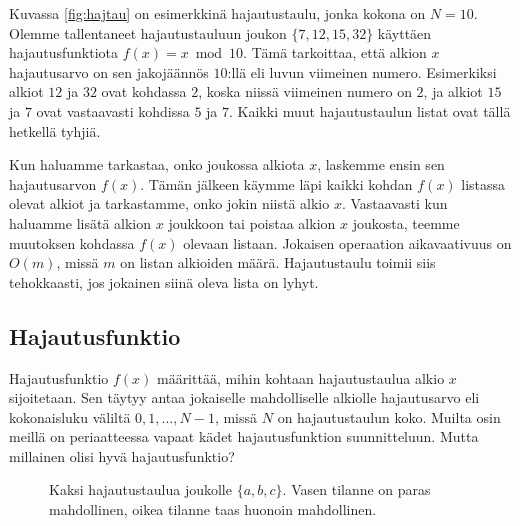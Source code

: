 Kuvassa \ref{fig:hajtau} on esimerkkinä hajautustaulu,
jonka kokona on $N=10$.
Olemme tallentaneet hajautustauluun joukon $\{7,12,15,32\}$
käyttäen hajautusfunktiota $f(x)=x \bmod 10$.
Tämä tarkoittaa, että alkion $x$ hajautusarvo on sen jakojäännös $10$:llä
eli luvun viimeinen numero.
Esimerkiksi alkiot $12$ ja $32$ ovat kohdassa $2$,
koska niissä viimeinen numero on $2$,
ja alkiot $15$ ja $7$ ovat vastaavasti kohdissa $5$ ja $7$.
Kaikki muut hajautustaulun listat ovat tällä hetkellä tyhjiä.

Kun haluamme tarkastaa, onko joukossa alkiota $x$,
laskemme ensin sen hajautusarvon $f(x)$.
Tämän jälkeen käymme läpi kaikki kohdan $f(x)$
listassa olevat alkiot ja tarkastamme,
onko jokin niistä alkio $x$.
Vastaavasti kun haluamme lisätä alkion $x$ joukkoon
tai poistaa alkion $x$ joukosta,
teemme muutoksen kohdassa $f(x)$ olevaan listaan.
Jokaisen operaation aikavaativuus on $O(m)$,
missä $m$ on listan alkioiden määrä.
Hajautustaulu toimii siis tehokkaasti, jos jokainen
siinä oleva lista on lyhyt.

\subsection{Hajautusfunktio}

Hajautusfunktio $f(x)$ määrittää, mihin kohtaan hajautustaulua
alkio $x$ sijoitetaan.
Sen täytyy antaa jokaiselle mahdolliselle alkiolle
hajautusarvo eli kokonaisluku väliltä $0,1,\dots,N-1$,
missä $N$ on hajautustaulun koko.
Muilta osin meillä on periaatteessa vapaat kädet
hajautusfunktion suunnitteluun.
Mutta millainen olisi hyvä hajautusfunktio?

\begin{figure}
\center
{}
\caption{Kaksi hajautustaulua joukolle $\{a,b,c\}$.
Vasen tilanne on paras mahdollinen, oikea tilanne taas
huonoin mahdollinen.}
\label{fig:hajjak}
\end{figure}

